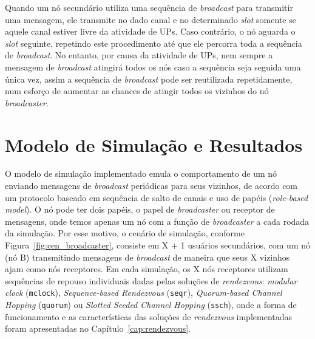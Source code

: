 Quando um nó secundário utiliza uma sequência de {\it broadcast} para transmitir uma mensagem, ele transmite no dado canal e no determinado {\it slot} somente se aquele canal estiver livre da atividade de UPs. Caso contrário, o nó aguarda o {\it slot} seguinte, repetindo este procedimento até que ele percorra toda a sequência de {\it broadcast}. No entanto, por causa da atividade de UPs, nem sempre a mensagem de {\it broadcast} atingirá todos os nós caso a sequência seja seguida uma única vez, assim a sequência de {\it broadcast} pode ser reutilizada repetidamente, num esforço de aumentar as chances de atingir todos os vizinhos do nó {\it broadcaster}.


\section{Modelo de Simulação e Resultados}
\label{sec:sim_cap_broadcast}


O modelo de simulação implementado emula o comportamento de um nó enviando mensagens de {\it broadcast} periódicas para seus vizinhos, de acordo com um  protocolo baseado em sequência de salto de canais e uso de papéis ({\it role-based model}). O nó pode ter dois papéis, o papel de {\it broadcaster} ou receptor de mensagens, onde temos apenas um nó com a função de {\it broadcaster} a cada rodada da simulação. Por esse motivo, o cenário de simulação, conforme Figura~\ref{fig:cen_broadcaster}, consiste em X $+$ 1 usuários secundários, com um nó (nó B) transmitindo mensagens de {\it broadcast} de maneira que seus X vizinhos ajam como nós receptores. Em cada simulação, os X nós receptores utilizam sequências de repouso individuais dadas pelas soluções de {\it rendezvous}: {\it modular clock} ({\tt mclock}), {\it Sequence-based Rendezvous} ({\tt seqr}), {\it Quorum-based Channel Hopping} ({\tt quorum}) ou {\it Slotted Seeded Channel Hopping} ({\tt ssch}), onde a forma de funcionamento e as características das soluções de {\it rendezvous} implementadas foram apresentadas no Capítulo~\ref{cap:rendezvous}.


